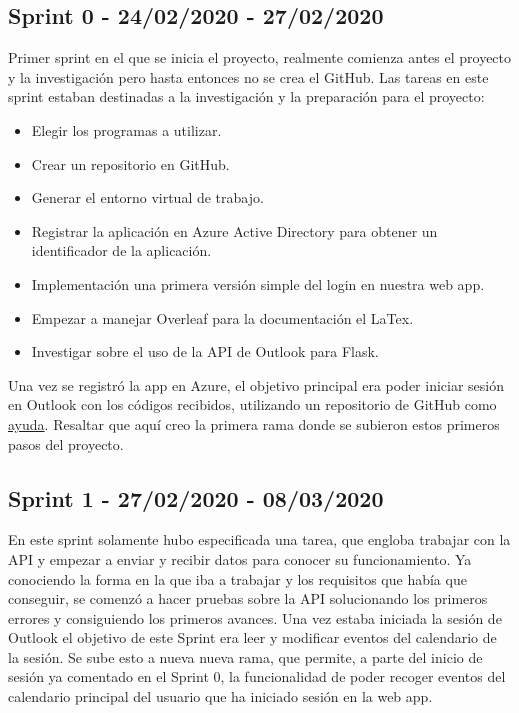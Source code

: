 \subsection{Sprint 0 - 24/02/2020 - 27/02/2020}
Primer sprint en el que se inicia el proyecto, realmente comienza antes el proyecto y la investigación pero hasta entonces no se crea el GitHub. Las tareas en este sprint estaban destinadas a la investigación y la preparación para el proyecto:
\begin{itemize}
    \item Elegir los programas a utilizar. 
	\item Crear un repositorio en GitHub.
    \item Generar el entorno virtual de trabajo.
    \item Registrar la aplicación en Azure Active Directory para obtener un identificador de la aplicación.
	\item Implementación una primera versión simple del login en nuestra web app.
	\item Empezar a manejar Overleaf para la documentación el LaTex.
	\item Investigar sobre el uso de la API de Outlook para Flask.
\end{itemize}
Una vez se registró la app en Azure, el objetivo principal era poder iniciar sesión en Outlook con los códigos recibidos, utilizando un repositorio de GitHub como \href{https://github.com/brysontyrrell/Office-365-Flask-App}{ayuda}\cite{loginO365}.
Resaltar que aquí creo la primera rama donde se subieron estos primeros pasos del proyecto.
\subsection{Sprint 1 - 27/02/2020 - 08/03/2020}
En este sprint solamente hubo especificada una tarea, que engloba trabajar con la API y empezar a enviar y recibir datos para conocer su funcionamiento. Ya conociendo la forma en la que iba a trabajar y los requisitos que había que conseguir, se comenzó a hacer pruebas sobre la API solucionando los primeros errores y consiguiendo los primeros avances.\newline
Una vez estaba iniciada la sesión de Outlook el objetivo de este Sprint era leer y modificar eventos del calendario de la sesión. Se sube esto a nueva nueva rama, que permite, a parte del inicio de sesión ya comentado en el Sprint 0, la funcionalidad de poder recoger eventos del calendario principal del usuario que ha iniciado sesión en la web app.

